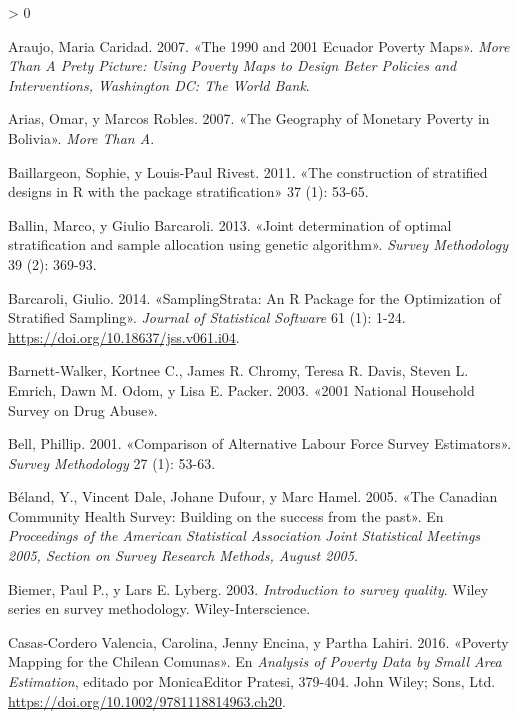 \documentclass[
  12pt,
  spanish,
]{book}
\newlength{\cslhangindent}
\newenvironment{CSLReferences}[2] %
 {%
  \setlength{\parindent}{0pt}
  \ifodd #1 \everypar{\setlength{\hangindent}{\cslhangindent}}\ignorespaces\fi
  \ifnum #2 > 0
  \setlength{\parskip}{#2\baselineskip}
  \fi
 }%
 {}
\begin{document}
\hypertarget{refs}{}
\begin{CSLReferences}{1}{0}
\leavevmode\hypertarget{ref-araujo20071990}{}%
Araujo, Maria Caridad. 2007. {«The 1990 and 2001 Ecuador Poverty Maps»}. \emph{More Than A Prety Picture: Using Poverty Maps to Design Beter Policies and Interventions, Washington DC: The World Bank}.

\leavevmode\hypertarget{ref-arias2007geography}{}%
Arias, Omar, y Marcos Robles. 2007. {«The Geography of Monetary Poverty in Bolivia»}. \emph{More Than A}.

\leavevmode\hypertarget{ref-Baillargeon_Rivest_2011}{}%
Baillargeon, Sophie, y Louis-Paul Rivest. 2011. {«The construction of stratified designs in R with the package stratification»} 37 (1): 53-65.

\leavevmode\hypertarget{ref-Ballin_Barcaroli_2013}{}%
Ballin, Marco, y Giulio Barcaroli. 2013. {«Joint determination of optimal stratification and sample allocation using genetic algorithm»}. \emph{Survey Methodology} 39 (2): 369-93.

\leavevmode\hypertarget{ref-Barcaroli_2014}{}%
Barcaroli, Giulio. 2014. {«SamplingStrata: An R Package for the Optimization of Stratified Sampling»}. \emph{Journal of Statistical Software} 61 (1): 1-24. \url{https://doi.org/10.18637/jss.v061.i04}.

\leavevmode\hypertarget{ref-Barnett_Walker_Chromy_Davis_Emrich_Odom_Packer_2003}{}%
Barnett-Walker, Kortnee C., James R. Chromy, Teresa R. Davis, Steven L. Emrich, Dawn M. Odom, y Lisa E. Packer. 2003. {«2001 National Household Survey on Drug Abuse»}.

\leavevmode\hypertarget{ref-Bell_2001}{}%
Bell, Phillip. 2001. {«Comparison of Alternative Labour Force Survey Estimators»}. \emph{Survey Methodology} 27 (1): 53-63.

\leavevmode\hypertarget{ref-Beland_Dale_Dufour_Hamel_2005}{}%
Béland, Y., Vincent Dale, Johane Dufour, y Marc Hamel. 2005. {«The Canadian Community Health Survey: Building on the success from the past»}. En \emph{Proceedings of the American Statistical Association Joint Statistical Meetings 2005, Section on Survey Research Methods, August 2005}.

\leavevmode\hypertarget{ref-Biemer_Lyberg_2003}{}%
Biemer, Paul P., y Lars E. Lyberg. 2003. \emph{Introduction to survey quality}. Wiley series en survey methodology. Wiley-Interscience.

\leavevmode\hypertarget{ref-Casas_Cordero_Valencia_Encina_Lahiri_2016}{}%
Casas-Cordero Valencia, Carolina, Jenny Encina, y Partha Lahiri. 2016. {«Poverty Mapping for the Chilean Comunas»}. En \emph{Analysis of Poverty Data by Small Area Estimation}, editado por MonicaEditor Pratesi, 379-404. John Wiley; Sons, Ltd. \url{https://doi.org/10.1002/9781118814963.ch20}.


\end{CSLReferences}
\end{document}
